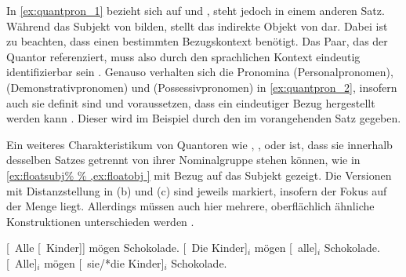 In \cref{ex:quantpron_1} bezieht sich  auf  und ,
steht jedoch in einem anderen Satz. Während  das Subjekt
von  bilden, stellt  das indirekte Objekt von
 dar. Dabei ist zu beachten, dass  einen bestimmten
Bezugskontext benötigt. Das Paar, das der Quantor referenziert, muss also durch
den sprachlichen Kontext eindeutig identifizierbar sein
\autocites[vgl.~z.\,B.][274]{lyons1999}[788]{schwartz2000}[983]{janssen2004}.
Genauso verhalten sich die Pronomina  (Personalpronomen), 
(Demonstrativpronomen) und  (Possessivpronomen) in
\cref{ex:quantpron_2}, insofern auch sie definit sind und voraussetzen, dass
ein eindeutiger Bezug hergestellt werden kann
\autocites[vgl.][145--148]{lyons1999}. Dieser wird im Beispiel durch den
 im vorangehenden Satz gegeben.

Ein weiteres Charakteristikum von Quantoren wie ,
,  oder  ist, dass sie innerhalb desselben
Satzes getrennt von ihrer Nominalgruppe stehen können, wie in
\cref{ex:floatsubj%
} mit Bezug auf das Subjekt
gezeigt. Die Versionen mit Distanzstellung in (b) und (c) sind jeweils
markiert, insofern der Fokus auf der Menge liegt. Allerdings müssen auch hier
mehrere, oberflächlich ähnliche Konstruktionen unterschieden werden
\autocites[27--28]{pittner1995}[65--67]{fanselowcavar2002}.

\begin{exe}
\ex \label{ex:floatsubj}
\begin{xlist}
	\ex \label{ex:floatsubj_1}
		[~Alle [~Kinder]] mögen Schokolade.
	\ex \label{ex:floatsubj_2}
		[~Die Kinder]$_i$ mögen [~alle]$_i$ Schokolade.
	\ex \label{ex:floatsubj_3}
		[~Alle]$_i$ mögen [~sie/*die Kinder]$_i$
			Schokolade.
\end{xlist}

\end{exe}

